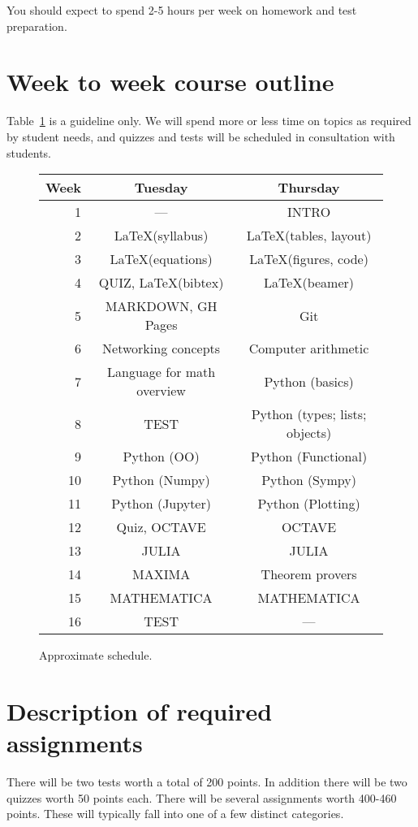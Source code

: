 \documentclass[12pt]{article}
\begin{document}
You should expect to spend 2-5 hours per week on homework and test
preparation.

\section*{Week to week course outline}

Table~\ref{fig:schedule} is a guideline only. We will spend more or less time on
topics as required by student needs, and quizzes and tests will be
scheduled in consultation with students.

\begin{figure}
\centering
\begin{tabular}{|r||c|c|} \hline
Week & Tuesday & Thursday \\ \hline
1 & --- & INTRO \\
2 & \LaTeX (syllabus) & \LaTeX (tables, layout) \\
3 & \LaTeX (equations) & \LaTeX (figures, code) \\
4 & QUIZ, \LaTeX (bibtex) & \LaTeX (beamer) \\
5 & MARKDOWN, GH Pages & Git \\
6 & Networking concepts & Computer arithmetic \\
7 & Language for math overview & Python (basics) \\
8 & TEST & Python (types; lists; objects) \\
9 & Python (OO) & Python (Functional) \\
10 & Python (Numpy) & Python (Sympy) \\
11 & Python (Jupyter) & Python (Plotting) \\
12 & Quiz, OCTAVE & OCTAVE \\
13 & JULIA & JULIA \\
14 & MAXIMA & Theorem provers \\
15 & MATHEMATICA & MATHEMATICA \\
16 & TEST & --- \\ \hline
\end{tabular}
\caption{Approximate schedule.}
\label{fig:schedule}
\end{figure}

\section*{Description of required assignments}

There will be two tests worth a total of 200 points. In addition there
will be two quizzes worth 50 points each. There will be several
assignments worth 400-460 points.  These will typically fall into one of a few distinct categories.
\end{document}
